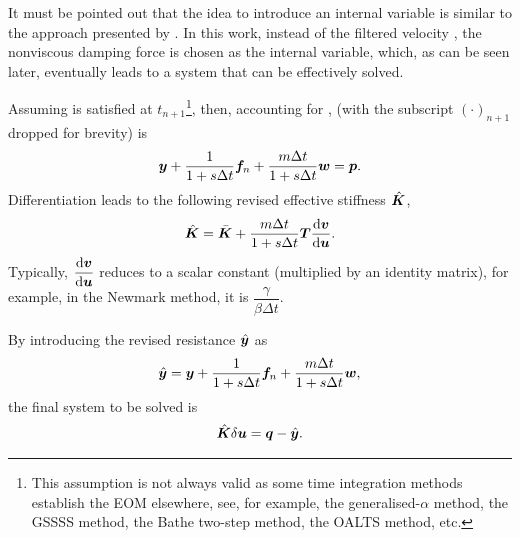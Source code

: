 It must be pointed out that the idea to introduce an internal variable is similar to the approach presented by \citet[][see \S~4.3]{Adhikari2014}. In this work, instead of the filtered velocity \citep[][see Eq. 4.23]{Adhikari2014}, the nonviscous damping force is chosen as the internal variable, which, as can be seen later, eventually leads to a system that can be effectively solved.

Assuming  is satisfied at $t_{n+1}$\footnote{This assumption is not always valid as some time integration methods establish the EOM elsewhere, see, for example, the generalised-$\alpha$ method, the GSSSS method, the Bathe two-step method, the OALTS method, etc.}, then, accounting for ,  (with the subscript $\left(\cdot\right)_{n+1}$ dropped for brevity) is
\begin{gather}\label{eq:residual}
\bm{y}+\dfrac{1}{1+s\Delta{}t}\bm{f}_n+\dfrac{m\Delta{}t}{1+s\Delta{}t}\bm{w}=\bm{p}.
\end{gather}
Differentiation leads to the following revised effective stiffness $\hat{\bm{K}}$,
\begin{gather}\label{eq:revised_k}
\hat{\bm{K}}=\bar{\bm{K}}+\dfrac{m\Delta{}t}{1+s\Delta{}t}\bm{T}\dfrac{\mathrm{d}\bm{v}}{\mathrm{d}\bm{u}}.
\end{gather}
Typically, $\dfrac{\mathrm{d}\bm{v}}{\mathrm{d}\bm{u}}$ reduces to a scalar constant (multiplied by an identity matrix), for example, in the Newmark method, it is $\dfrac{\gamma}{\beta\Delta{}t}$.

By introducing the revised resistance $\hat{\bm{y}}$ as
\begin{gather}\label{eq:revised_y}
\hat{\bm{y}}=\bm{y}+\dfrac{1}{1+s\Delta{}t}\bm{f}_n+\dfrac{m\Delta{}t}{1+s\Delta{}t}\bm{w},
\end{gather}
the final system to be solved is
\begin{gather}\label{eq:revised_system}
\hat{\bm{K}}\delta\bm{u}=\bm{q}-\hat{\bm{y}}.
\end{gather}

